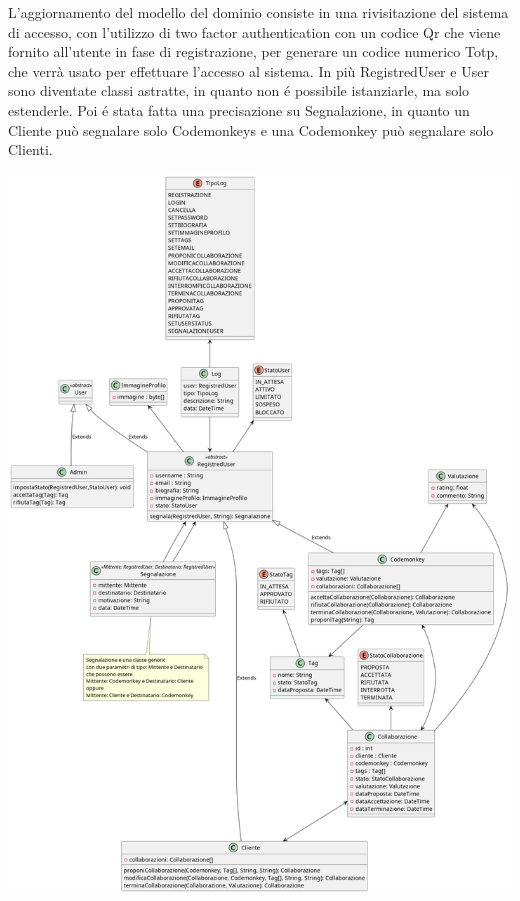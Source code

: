 L'aggiornamento del modello del dominio consiste in una rivisitazione del sistema di accesso, con l'utilizzo di two factor authentication con un codice Qr che viene fornito all'utente in fase di registrazione, per generare un codice numerico Totp, che verrà usato per effettuare l'accesso al sistema. In più RegistredUser e User sono diventate classi astratte, in quanto non é possibile istanziarle, ma solo estenderle. Poi é stata fatta una precisazione su Segnalazione, in quanto un Cliente può segnalare solo Codemonkeys e una Codemonkey può segnalare solo Clienti.\\
\linebreak

\includegraphics[width=1\textwidth]{assets/plantuml/modello_di_dettaglio_del_dominio.png}\\